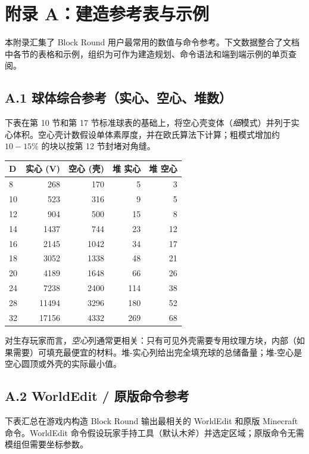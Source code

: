 \documentclass[12pt,a4paper]{scrartcl}
\begin{document}
\clearpage

\section*{\color{accent}附录 A：建造参考表与示例}

本附录汇集了 Block Round 用户最常用的数值与命令参考。下文数据整合了文档中各节的表格和示例，组织为可作为建造规划、命令语法和端到端示例的单页查阅。

\subsection*{A.1 球体综合参考（实心、空心、堆数）}
下表在第 10 节和第 17 节标准球表的基础上，将空心壳变体（\emph{细}模式）并列于实心体积。空心壳计数假设单体素厚度，并在欧氏算法下计算；粗模式增加约 $10{-}15\%$ 的块以按第 12 节封堵对角缝。

\vspace{0.4em}
\begin{center}
\begin{tabular}{@{}lrrrr@{}}
\toprule
\textbf{D} & \textbf{实心 (V)} & \textbf{空心 (壳)} & \textbf{堆 实心} & \textbf{堆 空心} \\
\midrule
8   &   268 &   170 &  5  &  3  \\
10  &   523 &   316 &  9  &  5  \\
12  &   904 &   500 & 15  &  8  \\
14  &  1437 &   744 & 23  & 12  \\
16  &  2145 &  1042 & 34  & 17  \\
18  &  3052 &  1338 & 48  & 21  \\
20  &  4189 &  1648 & 66  & 26  \\
24  &  7238 &  2400 & 114 & 38  \\
28  & 11494 &  3296 & 180 & 52  \\
32  & 17156 &  4332 & 269 & 68  \\
\bottomrule
\end{tabular}
\end{center}

对生存玩家而言，\emph{空心}列通常更相关：只有可见外壳需要专用纹理方块，内部（如果需要）可填充最便宜的材料。堆-实心列给出完全填充球的总储备量；堆-空心是空心圆顶或外壳的实际最小值。

\subsection*{A.2 WorldEdit / 原版命令参考}
下表汇总在游戏内构造 Block Round 输出最相关的 WorldEdit 和原版 Minecraft 命令。WorldEdit 命令假设玩家手持工具（默认木斧）并选定区域；原版命令无需模组但需要坐标参数。
\end{document}
